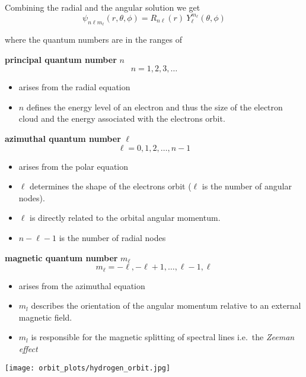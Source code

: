Combining the radial and the angular solution we get
\begin{equation*}
    \psi_{n\ell m_\ell}(r,\theta,\phi) = R_{n\ell}(r)\:Y_\ell^{m_\ell}(\theta, \phi)
\end{equation*}

where the quantum numbers are in the ranges of

\newpar{}
\textbf{principal quantum number} $n$
\noindent\begin{equation*}
    n = 1, 2, 3, \ldots
\end{equation*}
\begin{itemize}
    \item arises from the radial equation
    \item $n$ defines the energy level of an electron and thus the size of the electron cloud and the energy associated with the electrons orbit.
\end{itemize}

\newpar{}
\textbf{azimuthal quantum number} $\ell$
\noindent\begin{equation*}
    \ell = 0, 1, 2, \ldots , n-1
\end{equation*}
\begin{itemize}
    \item arises from the polar equation
    \item $\ell$ determines the shape of the electrons orbit ($\ell$ is the number of angular nodes).
    \item $\ell$ is directly related to the orbital angular momentum.
    \item $n-\ell-1$ is the number of radial nodes
\end{itemize}

\newpar{}
\textbf{magnetic quantum number} $m_\ell$
\noindent\begin{equation*}
    m_\ell =-\ell, -\ell+1, \ldots , \ell-1, \ell
\end{equation*}
\begin{itemize}
    \item arises from the azimuthal equation
    \item $m_l$ describes the orientation of the angular momentum relative to an external magnetic field.
    \item $m_l$ is responsible for the magnetic splitting of spectral lines i.e.\ the \textit{Zeeman effect}
\end{itemize}

\begin{center}
    \texttt{[image: orbit\_plots/hydrogen\_orbit.jpg]}
\end{center}

